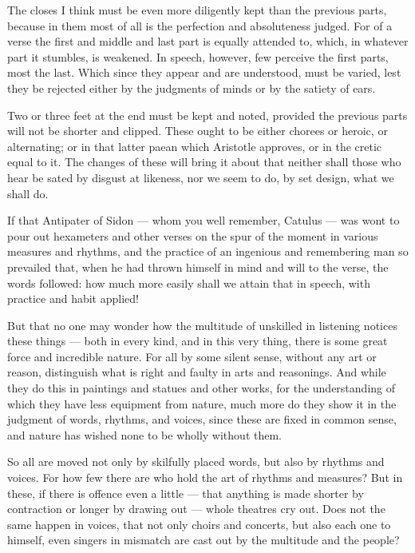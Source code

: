  The closes I think must be even more diligently kept than the previous parts, because in them most of all is the perfection and absoluteness judged. For of a verse the first and middle and last part is equally attended to, which, in whatever part it stumbles, is weakened. In speech, however, few perceive the first parts, most the last. Which since they appear and are understood, must be varied, lest they be rejected either by the judgments of minds or by the satiety of ears.

 Two or three feet at the end must be kept and noted, provided the previous parts will not be shorter and clipped. These ought to be either chorees or heroic, or alternating; or in that latter paean which Aristotle approves, or in the cretic equal to it. The changes of these will bring it about that neither shall those who hear be sated by disgust at likeness, nor we seem to do, by set design, what we shall do.

 If that Antipater of Sidon — whom you well remember, Catulus — was wont to pour out hexameters and other verses on the spur of the moment in various measures and rhythms, and the practice of an ingenious and remembering man so prevailed that, when he had thrown himself in mind and will to the verse, the words followed: how much more easily shall we attain that in speech, with practice and habit applied!

 But that no one may wonder how the multitude of unskilled in listening notices these things — both in every kind, and in this very thing, there is some great force and incredible nature. For all by some silent sense, without any art or reason, distinguish what is right and faulty in arts and reasonings. And while they do this in paintings and statues and other works, for the understanding of which they have less equipment from nature, much more do they show it in the judgment of words, rhythms, and voices, since these are fixed in common sense, and nature has wished none to be wholly without them.

 So all are moved not only by skilfully placed words, but also by rhythms and voices. For how few there are who hold the art of rhythms and measures? But in these, if there is offence even a little — that anything is made shorter by contraction or longer by drawing out — whole theatres cry out. Does not the same happen in voices, that not only choirs and concerts, but also each one to himself, even singers in mismatch are cast out by the multitude and the people?


